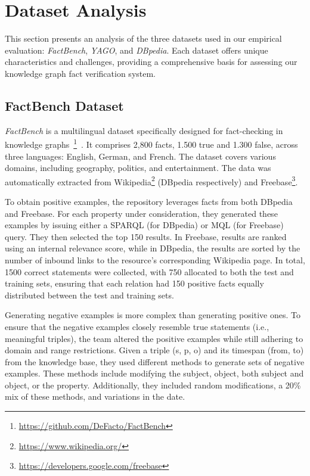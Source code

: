 \section{Dataset Analysis}\label{sec:empirical-evaluation:dataset-analysis}
This section presents an analysis of the three datasets used in our empirical evaluation: \textit{FactBench}, \textit{YAGO}, and \textit{DBpedia}.
Each dataset offers unique characteristics and challenges, providing a comprehensive basis for assessing our knowledge graph fact verification system.
\subsection{FactBench Dataset}\label{subsec:empirical-evaluation:dataset-analysis:factbench}
\textit{FactBench} is a multilingual dataset specifically designed for fact-checking in knowledge graphs~\footnote{\url{https://github.com/DeFacto/FactBench}}~\cite{GERBER201585}.
It comprises 2,800 facts, 1.500 true and 1.300 false, across three languages: English, German, and French.
The dataset covers various domains, including geography, politics, and entertainment.
The data was automatically extracted from Wikipedia\footnote{\url{https://www.wikipedia.org/}} (DBpedia respectively) and Freebase\footnote{\url{https://developers.google.com/freebase}}.

To obtain positive examples, the repository leverages facts from both DBpedia and Freebase.
For each property under consideration, they generated these examples by issuing either a SPARQL (for DBpedia) or MQL (for Freebase) query.
They then selected the top 150 results.
In Freebase, results are ranked using an internal relevance score, while in DBpedia, the results are sorted by the number of inbound links to the resource’s corresponding Wikipedia page.
In total, 1500 correct statements were collected, with 750 allocated to both the test and training sets, ensuring that each relation had 150 positive facts equally distributed between the test and training sets.

Generating negative examples is more complex than generating positive ones.
To ensure that the negative examples closely resemble true statements (i.e., meaningful triples), the team altered the positive examples while still adhering to domain and range restrictions.
Given a triple (s, p, o) and its timespan (from, to) from the knowledge base, they used different methods to generate sets of negative examples.
These methods include modifying the subject, object, both subject and object, or the property.
Additionally, they included random modifications, a 20\% mix of these methods, and variations in the date.

